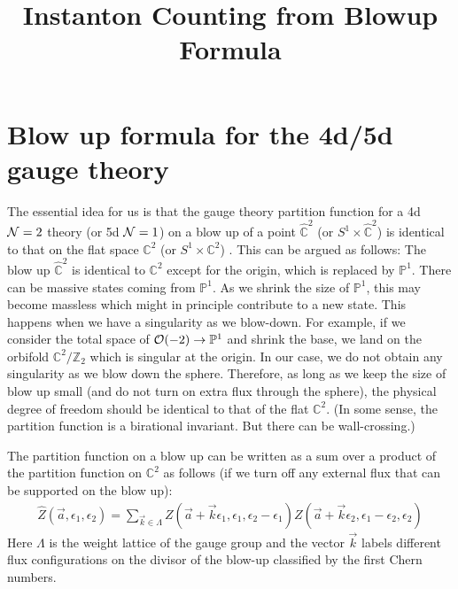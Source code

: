 \documentclass[11pt]{article}
\title{Instanton Counting from Blowup Formula}
\def\IC{\mathbb{C}}
\def\IP{\mathbb{P}}
\def\IZ{\mathbb{Z}}
\def\CN{{\cal N}}
\def\CO{{\cal O}}
\def\e{\epsilon}
\begin{document}
\maketitle

\section{Blow up formula for the 4d/5d gauge theory}
The essential idea for us is that the gauge theory partition function for a 4d $\CN=2$ theory (or 5d $\CN=1$) on a blow up of a point $\hat{\IC}^2$ (or $S^1 \times \hat{\IC}^2$) is identical to that on the flat space $\IC^2$ (or $S^1 \times \IC^2$) \cite{Nakajima:2003pg, Nakajima:2003uh,Nakajima:2005fg}. This can be argued as follows: The blow up $\hat{\IC}^2$ is identical to $\IC^2$ except for the origin, which is replaced by $\IP^1$. There can be massive states coming from $\IP^1$. As we shrink the size of $\IP^1$, this may become massless which might in principle contribute to a new state. This happens when we have a singularity as we blow-down. For example, if we consider the total space of $\CO(-2) \to \IP^1$ and shrink the base, we land on the orbifold $\IC^2/\IZ_2$ which is singular at the origin. In our case, we do not obtain any singularity as we blow down the sphere. Therefore, as long as we keep the size of blow up small (and do not turn on extra flux through the sphere), the physical degree of freedom should be identical to that of the flat $\IC^2$. (In some sense, the partition function is a birational invariant. But there can be wall-crossing.)

The partition function on a blow up can be written as a sum over a product of the partition function on $\IC^2$ as follows (if we turn off any external flux that can be supported on the blow up):
\begin{align} \label{eq:blowup}
 \hat{Z}(\vec{a}, \e_1, \e_2) = \sum_{\vec{k} \in \Lambda} Z(\vec{a}+ \vec{k} \e_1, \e_1, \e_2 - \e_1) Z(\vec{a}+\vec{k} \e_2, \e_1 - \e_2, \e_2) 
\end{align}
Here $\Lambda$ is the weight lattice of the gauge group and the vector $\vec{k}$ labels different flux configurations on the divisor of the blow-up classified by the first Chern numbers. 
\end{document}
